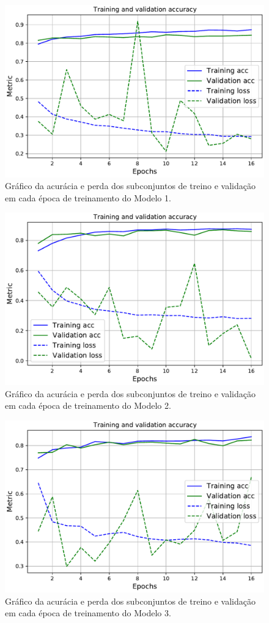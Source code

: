 \begin{figure}[h!]
  \centering
  \includegraphics[width=.79\textwidth]{figures/conv_train2.pdf}
  \caption{Gráfico da acurácia e perda dos subconjuntos de treino e validação em cada época de treinamento do Modelo 1.}
  \label{fig:conv_train}
\end{figure}

\begin{figure}[h!]
  \centering
  \includegraphics[width=.79\textwidth]{figures/pretrained_train2.pdf}
  \caption{Gráfico da acurácia e perda dos subconjuntos de treino e validação em cada época de treinamento do Modelo 2.}
  \label{fig:pretrained_train}
\end{figure}

\begin{figure}[h!]
  \centering
  \includegraphics[width=.79\textwidth]{figures/splus_train.pdf}
  \caption{Gráfico da acurácia e perda dos subconjuntos de treino e validação em cada época de treinamento do Modelo 3.}
  \label{fig:splus_train}
\end{figure}
